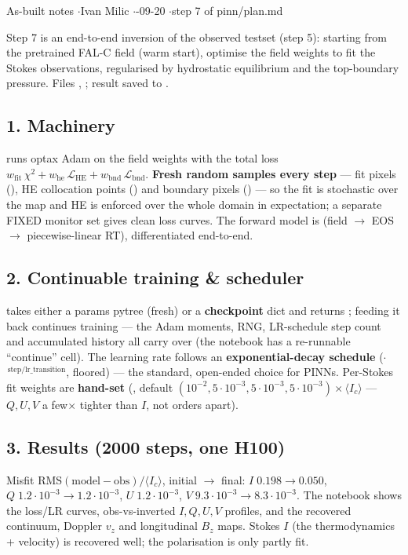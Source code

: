 


%
{As-built notes \quad$\cdot$\quad Ivan Milic \quad$\cdot$-09-20 \quad$\cdot$\quad step 7 of pinn/plan.md}

Step 7 is an end-to-end inversion of the observed testset (step 5): starting from the pretrained FAL-C field
(warm start), optimise the field weights to fit the Stokes observations, regularised by hydrostatic
equilibrium and the top-boundary pressure. Files , ;
result saved to .

\subsection*{1. Machinery}
 runs optax Adam on the field weights with the total loss
$w_\mathrm{fit}\,\chi^2 + w_\mathrm{he}\,\mathcal L_\mathrm{HE} + w_\mathrm{bnd}\,\mathcal L_\mathrm{bnd}$.
\textbf{Fresh random samples every step} --- fit pixels (), HE collocation points ()
and boundary pixels () --- so the fit is stochastic over the map and HE is enforced over the
whole domain in expectation; a separate FIXED monitor set gives clean loss curves. The forward model is
 (field $\to$ EOS $\to$ piecewise-linear RT), differentiated end-to-end.

\subsection*{2. Continuable training \& scheduler}
 takes either a params pytree (fresh) or a \textbf{checkpoint} dict and returns
; feeding it back continues training --- the Adam moments,
RNG, LR-schedule step count and accumulated history all carry over (the notebook has a re-runnable
``continue'' cell). The learning rate follows an \textbf{exponential-decay schedule}
($\cdot$$^{\,\mathrm{step}/\mathrm{lr\_transition}}$, floored) --- the standard,
open-ended choice for PINNs. Per-Stokes fit weights are \textbf{hand-set} (, default
$(10^{-2},5{\cdot}10^{-3},5{\cdot}10^{-3},5{\cdot}10^{-3})\times\langle I_c\rangle$ --- $Q,U,V$ a few$\times$
tighter than $I$, not orders apart).

\subsection*{3. Results (2000 steps, one H100)}
Misfit RMS$(\text{model}-\text{obs})/\langle I_c\rangle$, initial $\to$ final:
$I\;0.198\!\to\!0.050$, $Q\;1.2{\cdot}10^{-3}\!\to\!1.2{\cdot}10^{-3}$, $U\;1.2{\cdot}10^{-3}$,
$V\;9.3{\cdot}10^{-3}\!\to\!8.3{\cdot}10^{-3}$. The notebook shows the loss/LR curves, obs-vs-inverted
$I,Q,U,V$ profiles, and the recovered continuum, Doppler $v_z$ and longitudinal $B_z$ maps. Stokes $I$ (the
thermodynamics + velocity) is recovered well; the polarisation is only partly fit.

